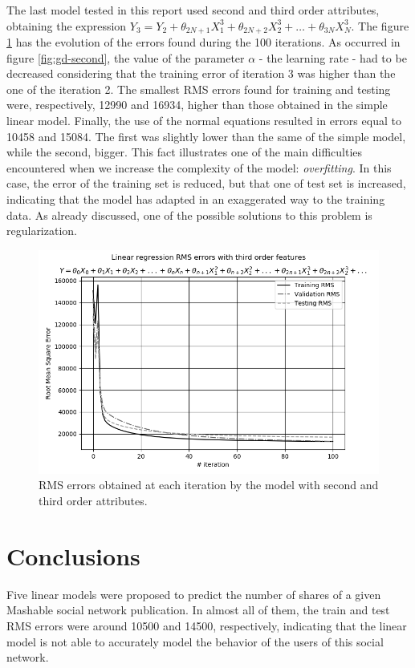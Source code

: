 \documentclass[10pt,twocolumn,letterpaper]{article}
\begin{document}
The last model tested in this report used second and third order attributes, obtaining the expression \(Y_3 = Y_2 + \theta_{2N + 1}X_1 ^ 3 + \theta_{2N + 2}X_2 ^ 3 + \ldots + \theta_{3N}X_N^3\). The figure \ref{fig:gd-third} has the evolution of the errors found during the 100 iterations. As occurred in figure \ref{fig:gd-second}, the value of the parameter \(\alpha\) - the learning rate - had to be decreased considering that the training error of iteration 3 was higher than the one of the iteration 2. The smallest RMS errors found for training and testing were, respectively, 12990 and 16934, higher than those obtained in the simple linear model. Finally, the use of the normal equations resulted in errors equal to 10458 and 15084. The first was slightly lower than the same of the simple model, while the second, bigger. This fact illustrates one of the main difficulties encountered when we increase the complexity of the model: \textit{overfitting}. In this case, the error of the training set is reduced, but that one of test set is increased, indicating that the model has adapted in an exaggerated way to the training data. As already discussed, one of the possible solutions to this problem is regularization.

\begin{figure}
    \centering
    \includegraphics[width=0.9\columnwidth]{img/lr-third-gd.png}
    \caption{RMS errors obtained at each iteration by the model with second and third order attributes.}
    \label{fig:gd-third}
\end{figure}

\section{Conclusions}

Five linear models were proposed to predict the number of shares of a given Mashable social network publication. In almost all of them, the train and test RMS errors were around 10500 and 14500, respectively, indicating that the linear model is not able to accurately model the behavior of the users of this social network.

{\small


}
\end{document}
